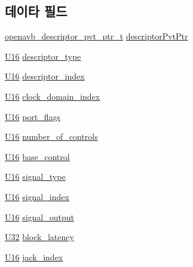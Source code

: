 \subsection*{데이타 필드}
\begin{DoxyCompactItemize}
\item 
\hyperlink{openavb__aem__pub_8h_a85eabab4b7d2466e94c1c3b43b11371d}{openavb\+\_\+descriptor\+\_\+pvt\+\_\+ptr\+\_\+t} \hyperlink{structopenavb__aem__descriptor__external__port__io__t_a302e92fd6cf4d398d5305395359fb157}{descriptor\+Pvt\+Ptr}
\item 
\hyperlink{openavb__types__base__pub_8h_a0a0a322d5fa4a546d293a77ba8b4a71f}{U16} \hyperlink{structopenavb__aem__descriptor__external__port__io__t_a1e231d7874aada5925b29affc76782cc}{descriptor\+\_\+type}
\item 
\hyperlink{openavb__types__base__pub_8h_a0a0a322d5fa4a546d293a77ba8b4a71f}{U16} \hyperlink{structopenavb__aem__descriptor__external__port__io__t_ab26fb363c24b9a2a4391f9171c981b08}{descriptor\+\_\+index}
\item 
\hyperlink{openavb__types__base__pub_8h_a0a0a322d5fa4a546d293a77ba8b4a71f}{U16} \hyperlink{structopenavb__aem__descriptor__external__port__io__t_a6bf82a91e71555466bdcba713002b1ff}{clock\+\_\+domain\+\_\+index}
\item 
\hyperlink{openavb__types__base__pub_8h_a0a0a322d5fa4a546d293a77ba8b4a71f}{U16} \hyperlink{structopenavb__aem__descriptor__external__port__io__t_a2fd7e2f507df1c9941b168d66a46e145}{port\+\_\+flags}
\item 
\hyperlink{openavb__types__base__pub_8h_a0a0a322d5fa4a546d293a77ba8b4a71f}{U16} \hyperlink{structopenavb__aem__descriptor__external__port__io__t_ab8a96da60faf5e9dfdef4464fbfd5288}{number\+\_\+of\+\_\+controls}
\item 
\hyperlink{openavb__types__base__pub_8h_a0a0a322d5fa4a546d293a77ba8b4a71f}{U16} \hyperlink{structopenavb__aem__descriptor__external__port__io__t_af2706407b5397c06e6f4c45474ba75d3}{base\+\_\+control}
\item 
\hyperlink{openavb__types__base__pub_8h_a0a0a322d5fa4a546d293a77ba8b4a71f}{U16} \hyperlink{structopenavb__aem__descriptor__external__port__io__t_a51ba5fdff9933eb274b46b67185d1c7b}{signal\+\_\+type}
\item 
\hyperlink{openavb__types__base__pub_8h_a0a0a322d5fa4a546d293a77ba8b4a71f}{U16} \hyperlink{structopenavb__aem__descriptor__external__port__io__t_ad948e7e79bb182b81a76a51c3d6ee9ed}{signal\+\_\+index}
\item 
\hyperlink{openavb__types__base__pub_8h_a0a0a322d5fa4a546d293a77ba8b4a71f}{U16} \hyperlink{structopenavb__aem__descriptor__external__port__io__t_a6a464d21574d97691ea70c2037ff8f6f}{signal\+\_\+output}
\item 
\hyperlink{openavb__types__base__pub_8h_a696390429f2f3b644bde8d0322a24124}{U32} \hyperlink{structopenavb__aem__descriptor__external__port__io__t_ac8dd29fd39cc138a898f39f7baa876ae}{block\+\_\+latency}
\item 
\hyperlink{openavb__types__base__pub_8h_a0a0a322d5fa4a546d293a77ba8b4a71f}{U16} \hyperlink{structopenavb__aem__descriptor__external__port__io__t_a3c2192fc427391c13d48a30c641746b7}{jack\+\_\+index}
\end{DoxyCompactItemize}


